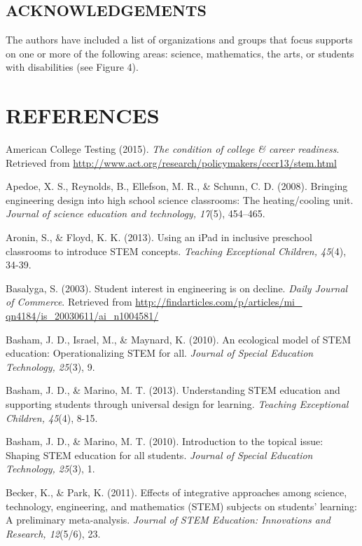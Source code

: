 \documentclass[11.5pt]{sig-alternate} %
\begin{document}
\begin{large}
\section*{ACKNOWLEDGEMENTS}
The authors have included a list of organizations and groups that focus supports on one or more of the following areas: science, mathematics, the arts, or students with disabilities (see Figure 4).

\end{large}
\clearpage
\section*{REFERENCES}\par 

\leftskip 0.25in
\parindent -0.25in 
American College Testing (2015). \textit{The condition of college \& career readiness}. Retrieved from \url{http://www.act.org/research/policymakers/cccr13/stem.html}

Apedoe, X. S., Reynolds, B., Ellefson, M. R., \& Schunn, C. D. (2008). Bringing engineering design into high school science classrooms: The heating/cooling unit. \textit{Journal of science education and technology, 17}(5), 454–465. 

Aronin, S., \& Floyd, K. K. (2013). Using an iPad in inclusive preschool classrooms to introduce STEM concepts. \textit{Teaching Exceptional Children, 45}(4), 34-39.

Basalyga, S. (2003). Student interest in engineering is on decline. \textit{Daily Journal of Commerce}. Retrieved from \url{http://findarticles.com/p/articles/mi_ qn4184/is_20030611/ai_n1004581/}

Basham, J. D., Israel, M., \& Maynard, K. (2010). An ecological model of STEM education: Operationalizing STEM for all. \textit{Journal of Special Education Technology, 25}(3), 9.

Basham, J. D., \& Marino, M. T. (2013). Understanding STEM education and supporting students through universal design for learning. \textit{Teaching Exceptional Children, 45}(4), 8-15.

Basham, J. D., \& Marino, M. T. (2010). Introduction to the topical issue: Shaping STEM education for all students. \textit{Journal of Special Education Technology, 25}(3), 1.

Becker, K., \& Park, K. (2011). Effects of integrative approaches among science, technology, engineering, and mathematics (STEM) subjects on students' learning: A preliminary meta-analysis. \textit{Journal of STEM Education: Innovations and Research, 12}(5/6), 23.
\end{document}
